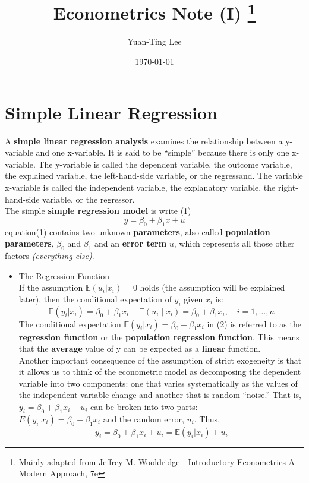 \documentclass[a4paper, 10pt]{article}
\title{Econometrics Note (I) \footnote{Mainly adapted from Jeffrey M. Wooldridge—Introductory Econometrics A Modern Approach, 7e}}
\author{Yuan-Ting Lee}
\date{\today}
\theoremstyle{definition}	%
\begin{document}
\maketitle

\section{Simple Linear Regression}
 A \textbf{simple linear regression analysis} examines the relationship between a y-variable and one x-variable. It is said to be “simple” because there is only one x-variable. The y-variable is called the dependent variable, the outcome variable, the explained variable, the left-hand-side variable, or the regressand. The variable x-variable is called the independent variable, the explanatory variable, the right-hand-side variable, or the regressor.\\
\indent The simple \textbf{simple regression model} is write (1)
\begin{equation}
    y = \beta_0 + \beta_1 x + u
\end{equation}
equation(1) contains two unknown \textbf{parameters}, also called \textbf{population parameters}, 
\(\beta_0\) and \(\beta_1\) and an \textbf{error term} \(u\), which represents all those other factors \textit{(everything else)}.
\begin{itemize}
    \item The Regression Function\\
    If the assumption \( \mathbb{E}(u_i | x_i) = 0 \) holds (the assumption will be explained later), then the conditional expectation of \( y_i \) given \( x_i \) is:
    \begin{equation}
        \mathbb{E}(y_i | x_i) = \beta_0 + \beta_1 x_i + \mathbb{E}(u_i \mid x_i) = \beta_0 + \beta_1 x_i, \quad i = 1, \dots, n
    \end{equation}
    The conditional expectation \( \mathbb{E}(y_i | x_i) = \beta_0 + \beta_1 x_i \) in (2) is referred to as the \textbf{regression function} or the \textbf{population regression function}. This means that the \textbf{average} value of y can be expected as a \textbf{linear} function.\\
    Another important consequence of the assumption of strict exogeneity is that it allows us to think of the econometric model as decomposing the dependent variable into two components: one that varies systematically as the values of the independent variable change and another that is random “noise.” That is, \(y_i = \beta_0 + \beta_1 x_i + u_i\) can be broken into two parts:\\ 
    \(E(y_i | x_i) = \beta_0 + \beta_1 x_i\) and the random error, \(u_i\). Thus, 
    \begin{equation*}
        y_i = \beta_0 + \beta_1 x_i + u_i = \mathbb{E}(y_i | x_i) + u_i
    \end{equation*}
\end{itemize}
\end{document}
